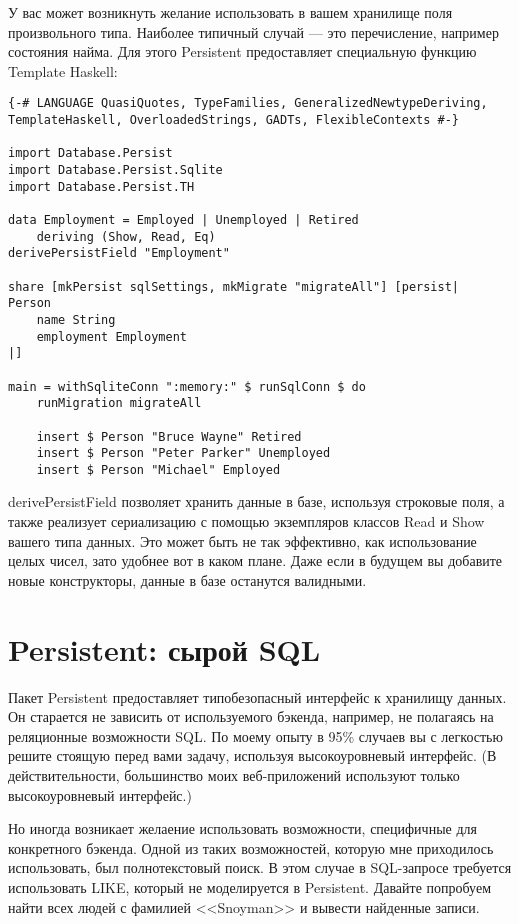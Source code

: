 У вас может возникнуть желание использовать в вашем хранилище поля произвольного типа. Наиболее типичный случай --- это перечисление, например состояния найма. Для этого Persistent предоставляет специальную функцию Template Haskell:

\begin{lstlisting}
{-# LANGUAGE QuasiQuotes, TypeFamilies, GeneralizedNewtypeDeriving, TemplateHaskell, OverloadedStrings, GADTs, FlexibleContexts #-}

import Database.Persist
import Database.Persist.Sqlite
import Database.Persist.TH

data Employment = Employed | Unemployed | Retired
    deriving (Show, Read, Eq)
derivePersistField "Employment"

share [mkPersist sqlSettings, mkMigrate "migrateAll"] [persist|
Person
    name String
    employment Employment
|]

main = withSqliteConn ":memory:" $ runSqlConn $ do
    runMigration migrateAll

    insert $ Person "Bruce Wayne" Retired
    insert $ Person "Peter Parker" Unemployed
    insert $ Person "Michael" Employed
\end{lstlisting}%

derivePersistField позволяет хранить данные в базе, используя строковые поля, а также реализует сериализацию с помощью экземпляров классов Read и Show вашего типа данных. Это может быть не так эффективно, как использование целых чисел, зато удобнее вот в каком плане. Даже если в будущем вы добавите новые конструкторы, данные в базе останутся валидными.

\section{Persistent: сырой SQL} %

Пакет Persistent предоставляет типобезопасный интерфейс к хранилищу данных. Он старается не зависить от используемого бэкенда, например, не полагаясь на реляционные возможности SQL. По моему опыту в 95\% случаев вы с легкостью решите стоящую перед вами задачу, используя высокоуровневый интерфейс. (В действительности, большинство моих веб-приложений используют только высокоуровневый интерфейс.)

Но иногда возникает желаение использовать возможности, специфичные для конкретного бэкенда. Одной из таких возможностей, которую мне приходилось использовать, был полнотекстовый поиск. В этом случае в SQL-запросе требуется использовать LIKE, который не моделируется в Persistent. Давайте попробуем найти всех людей с фамилией <<Snoyman>> и вывести найденные записи.

